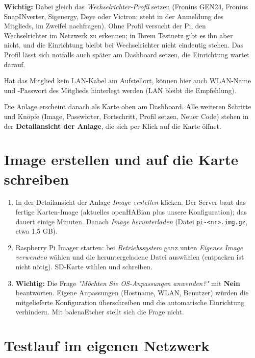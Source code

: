 \documentclass[a4paper,11pt]{article}
\newcommand{\phase}[1]{\textsf{\small #1}}
\begin{document}
\textbf{Wichtig:} Dabei gleich das \emph{Wechselrichter-Profil} setzen
(Fronius GEN24, Fronius SnapINverter, Sigenergy, Deye oder Victron; steht
in der Anmeldung des Mitglieds, im Zweifel nachfragen). Ohne Profil
versucht der Pi, den Wechselrichter im Netzwerk zu erkennen; in Ihrem
Testnetz gibt es ihn aber nicht, und die Einrichtung bleibt bei
\phase{Wechselrichter nicht eindeutig} stehen. Das Profil lässt sich
notfalls auch später am Dashboard setzen, die Einrichtung wartet darauf.

Hat das Mitglied kein LAN-Kabel am Aufstellort, können hier auch
WLAN-Name und -Passwort des Mitglieds hinterlegt werden (LAN bleibt die
Empfehlung).

Die Anlage erscheint danach als Karte oben am Dashboard. Alle weiteren
Schritte und Knöpfe (Image, Passwörter, Fortschritt, Profil setzen,
Neuer Code) stehen in der \textbf{Detailansicht der Anlage}, die sich
per Klick auf die Karte öffnet.

\section{Image erstellen und auf die Karte schreiben}

\begin{enumerate}[nosep]
    \item In der Detailansicht der Anlage \emph{Image erstellen} klicken. Der
          Server baut das fertige Karten-Image (aktuelles openHABian plus
          unsere Konfiguration); das dauert einige Minuten. Danach
          \emph{Image herunterladen} (Datei \texttt{pi-<nr>.img.gz},
          etwa 1{,}5 GB).
    \item Raspberry Pi Imager starten: bei \emph{Betriebssystem} ganz
          unten \emph{Eigenes Image verwenden} wählen und die
          heruntergeladene Datei auswählen (entpacken ist nicht nötig).
          SD-Karte wählen und schreiben.
    \item \textbf{Wichtig:} Die Frage \emph{"Möchten Sie OS-Anpassungen
          anwenden?"} mit \textbf{Nein} beantworten. Eigene Anpassungen
          (Hostname, WLAN, Benutzer) würden die mitgelieferte
          Konfiguration überschreiben und die automatische Einrichtung
          verhindern. Mit balenaEtcher stellt sich die Frage nicht.
\end{enumerate}

\section{Testlauf im eigenen Netzwerk}
\end{document}
